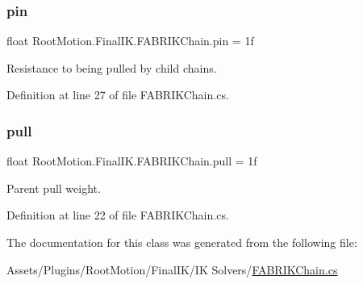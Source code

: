 \mbox{\label{class_root_motion_1_1_final_i_k_1_1_f_a_b_r_i_k_chain_a2e600dc5e25f1f1f5d25b1a356c8143f}} 
\subsubsection{\texorpdfstring{pin}{pin}}
{\footnotesize\ttfamily float Root\+Motion.\+Final\+I\+K.\+F\+A\+B\+R\+I\+K\+Chain.\+pin = 1f}



Resistance to being pulled by child chains. 



Definition at line 27 of file F\+A\+B\+R\+I\+K\+Chain.\+cs.

\mbox{\label{class_root_motion_1_1_final_i_k_1_1_f_a_b_r_i_k_chain_a1c40f2fd2938f09b553e41bde28fbc13}} 
\subsubsection{\texorpdfstring{pull}{pull}}
{\footnotesize\ttfamily float Root\+Motion.\+Final\+I\+K.\+F\+A\+B\+R\+I\+K\+Chain.\+pull = 1f}



Parent pull weight. 



Definition at line 22 of file F\+A\+B\+R\+I\+K\+Chain.\+cs.



The documentation for this class was generated from the following file\+:\begin{DoxyCompactItemize}
\item 
Assets/\+Plugins/\+Root\+Motion/\+Final\+I\+K/\+I\+K Solvers/\mbox{\hyperlink{_f_a_b_r_i_k_chain_8cs}{F\+A\+B\+R\+I\+K\+Chain.\+cs}}\end{DoxyCompactItemize}
